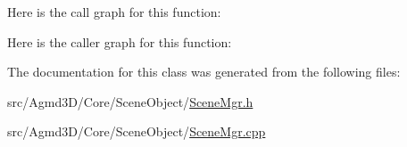 Here is the call graph for this function\+:




Here is the caller graph for this function\+:




The documentation for this class was generated from the following files\+:\begin{DoxyCompactItemize}
\item 
src/\+Agmd3\+D/\+Core/\+Scene\+Object/\hyperlink{_scene_mgr_8h}{Scene\+Mgr.\+h}\item 
src/\+Agmd3\+D/\+Core/\+Scene\+Object/\hyperlink{_scene_mgr_8cpp}{Scene\+Mgr.\+cpp}\end{DoxyCompactItemize}
